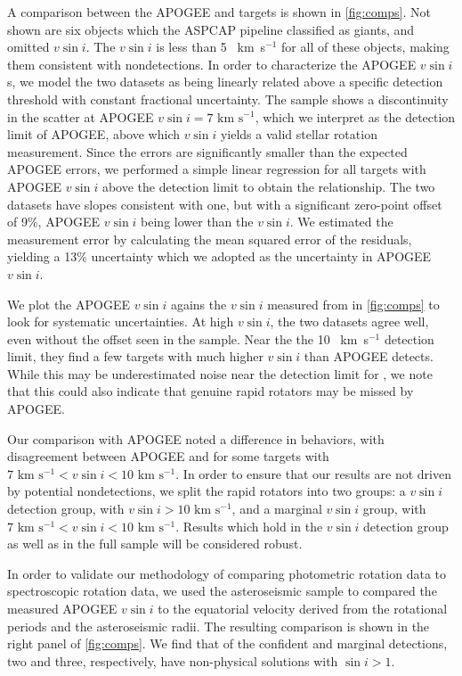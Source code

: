 \documentclass[manuscript]{aastex6}
\newcommand{\vsini}{\ensuremath{v \sin i}}
\newcommand{\kms}{\textrm{~km~s}\ensuremath{^{-1}}}
\begin{document}
A comparison between the APOGEE and \citet{Bruntt12} targets is shown in
\cref{fig:comps}. Not shown are six
objects which the ASPCAP pipeline classified as giants, and omitted
\vsini{}. The \citet{Bruntt12} \vsini{} is less than 5 \kms{} for all of 
these objects, making them consistent with 
nondetections.  In order to characterize the APOGEE \vsini{}s, we model the 
two datasets as being linearly related above a specific detection threshold 
with constant fractional uncertainty. The sample shows a 
discontinuity in the scatter at APOGEE \(\vsini=7\kms\), which we 
interpret as the detection limit of APOGEE, above which \vsini{} yields a 
valid stellar rotation measurement. Since the \citet{Bruntt12} errors are
significantly smaller than the expected APOGEE errors, we performed a simple 
linear regression for all targets with APOGEE \vsini{} above the detection 
limit to obtain the relationship. The two datasets have slopes
consistent with one, but with a significant zero-point offset of 9\%,
APOGEE \vsini{} being lower than the \citet{Bruntt12}
\vsini{}. We estimated the measurement error by calculating the mean squared 
error of the residuals, yielding a 13\% uncertainty which we adopted as the 
uncertainty in APOGEE \vsini{}.

We plot the APOGEE \vsini{} agains the \vsini{} measured from
\citet{Stauffer87} in \cref{fig:comps} to look for systematic
uncertainties. At high \vsini{}, the two datasets agree well, even
without the offset seen in the \citet{Bruntt12} sample. Near the the 10
\kms{} \citet{Stauffer87} detection limit, they find a few targets with
much higher \vsini{} than APOGEE detects. While this may be
underestimated noise near the detection limit for \citet{Stauffer87}, we
note that this could also indicate that genuine rapid rotators may be
missed by APOGEE\@.

Our comparison with APOGEE noted a difference in behaviors, with
disagreement between APOGEE and \citet{Stauffer87} for some
targets with \(7 \kms < \vsini < 10 \kms\). In order to ensure that our 
results are not driven by potential nondetections, we split the rapid
rotators into two groups: a \vsini{} detection group, with \(\vsini > 10
\kms\), and a marginal \vsini{} group, with \(7 \kms < \vsini < 10
\kms\). Results which hold in the \vsini{} detection group as well as in
the full sample will be considered robust.

In order to validate our methodology of comparing photometric rotation
data to spectroscopic rotation data, we used the asteroseismic sample to
compared the measured APOGEE \vsini{} to the equatorial velocity 
derived from the rotational periods and the asteroseismic radii. The resulting 
comparison is shown in the right panel of \cref{fig:comps}. We find that
of the confident and marginal detections, two and three, respectively, have 
non-physical solutions with \(\sin i > 1\). 
\end{document}
